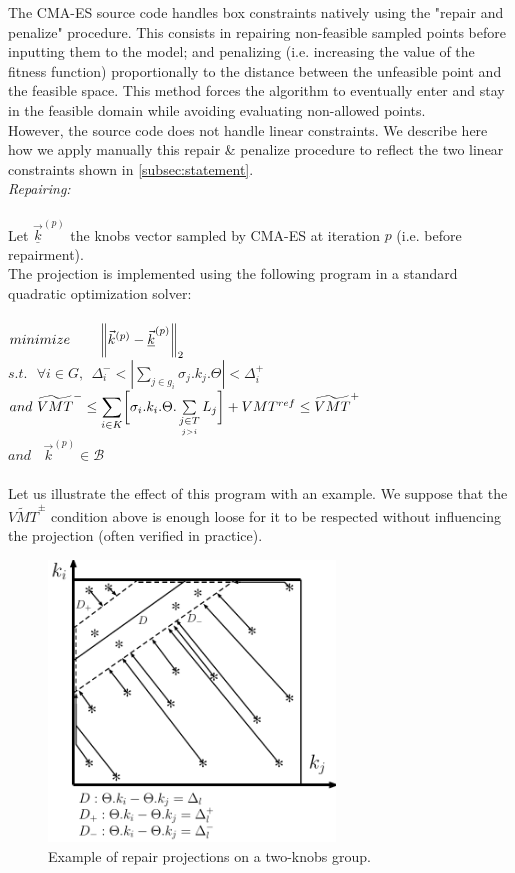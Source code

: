 The CMA-ES source code handles box constraints natively using the "repair and penalize" procedure. This consists in repairing non-feasible sampled points before inputting them to the model; and penalizing (i.e. increasing the value of the fitness function) proportionally to the distance between the unfeasible point and the feasible space. This method forces the algorithm to eventually enter and stay in the feasible domain while avoiding evaluating non-allowed points.\\
However, the source code does not handle linear constraints. We describe here how we apply manually this repair \& penalize procedure to reflect the two linear constraints shown in \ref{subsec:statement}.\\
\newpage
\emph{Repairing:}\\
\\
Let $\underline{\vec{k}}^{(p)}$ the knobs vector sampled by CMA-ES at iteration $p$ (i.e. before repairment).\\
The projection is implemented using the following program in a standard quadratic optimization solver:\\
\\
$minimize \ \ \ \ \ \ \norm{\vec{k}^{(p)}-\underline{\vec{k}}^{(p)}}_{2}$\\
$s.t.\ \ \ \forall i\in{G}, \ \ \Delta_{i}^{-}< |\sum_{j\in{g_{i}}} \sigma_{j}.k_{j}.\Theta|<\Delta_{i}^{+}$\\
$and\ \widetilde{VMT}^{-}\leq\mathlarger{\sum\limits_{i\in K}}\biggl[\sigma_{i}.k_{i}.\Theta.	\sum\limits_{\underset{j>i}{j\in T}}L_{j}\biggr]+VMT^{ref}\leq \widetilde{VMT}^{+}\nonumber $\\
$and\ \ \ \ \vec{k}^{(p)}\in \mathscr{B}$\\
\\
Let us illustrate the effect of this program with an example. We suppose that the $\widetilde{VMT}^{\pm}$ condition above is enough loose for it to be respected without influencing the projection (often verified in practice).
\begin{figure}[h!]
\centering
\includegraphics[width=3in]{figures/proj.pdf}
\caption{Example of repair projections on a two-knobs group.}
\label{fig:proj}
\end{figure}
